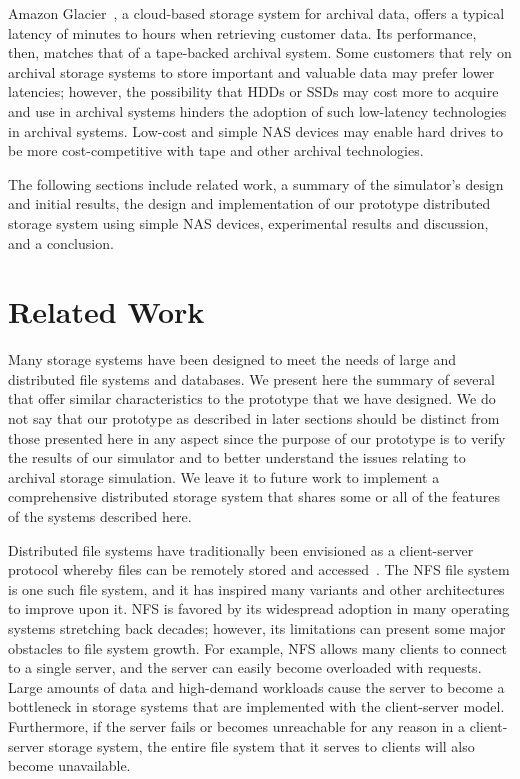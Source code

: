 Amazon Glacier~\cite{web6}, a cloud-based storage system for archival data, offers a typical latency of minutes to hours when retrieving customer data.  Its performance, then, matches that of a tape-backed archival system.  Some customers that rely on archival storage systems to store important and valuable data may prefer lower latencies; however, the possibility that HDDs or SSDs may cost more to acquire and use in archival systems hinders the adoption of such low-latency technologies in archival systems.  Low-cost and simple NAS devices may enable hard drives to be more cost-competitive with tape and other archival technologies.

The following sections include related work, a summary of the simulator's design and initial results, the design and implementation of our prototype distributed storage system using simple NAS devices, experimental results and discussion, and a conclusion.

\section{Related Work}
Many storage systems have been designed to meet the needs of large and distributed file systems and databases.  We present here the summary of several that offer similar characteristics to the prototype that we have designed.  We do not say that our prototype as described in later sections should be distinct from those presented here in any aspect since the purpose of our prototype is to verify the results of our simulator and to better understand the issues relating to archival storage simulation.  We leave it to future work to implement a comprehensive distributed storage system that shares some or all of the features of the systems described here.

Distributed file systems have traditionally been envisioned as a client-server protocol whereby files can be remotely stored and accessed~\cite{Sandberg85designand}.  The NFS file system is one such file system, and it has inspired many variants and other architectures to improve upon it.  NFS is favored by its widespread adoption in many operating systems stretching back decades; however, its limitations can present some major obstacles to file system growth.  For example, NFS allows many clients to connect to a single server, and the server can easily become overloaded with requests.  Large amounts of data and high-demand workloads cause the server to become a bottleneck in storage systems that are implemented with the client-server model.  Furthermore, if the server fails or becomes unreachable for any reason in a client-server storage system, the entire file system that it serves to clients will also become unavailable.

